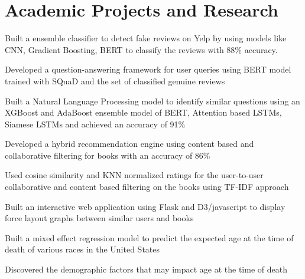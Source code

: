 \documentclass[]{resume-openfont}
\begin{document}
\begin{minipage}[t]{0.66\textwidth}

\section{Academic Projects and Research}

\descript{}\location{}
\begin{tightemize}
\item Built a ensemble classifier to detect fake reviews on Yelp by using models like CNN, Gradient Boosting, BERT to classify the reviews with 88\% accuracy.
\item Developed a question-answering framework for user queries using BERT model trained with SQuaD and the set of classified genuine reviews 
\end{tightemize}
\sectionsep

\descript{}\location{}
\begin{tightemize}
\item Built a Natural Language Processing model to identify similar questions using an XGBoost and AdaBoost ensemble model of BERT, Attention based LSTMs, Siamese LSTMs and achieved an accuracy of 91\%
\end{tightemize}
\sectionsep

\descript{}\location{}
\begin{tightemize}
\item Developed a hybrid recommendation engine using content based and collaborative filtering for books with an accuracy of 86\%
\item Used cosine similarity and KNN normalized ratings for the  user-to-user collaborative and content based filtering on the books using TF-IDF approach
\item Built an interactive web application using Flask and  D3/javascript to display force layout graphs between similar users and books
\end{tightemize}
\sectionsep


\descript{}\location{}
\begin{tightemize}
\item Built a mixed effect regression model to predict the expected age at the time of death of various races in the United States
\item Discovered the demographic factors that may impact age at the time of death
\end{tightemize}
\sectionsep


\end{minipage}
\end{document}
